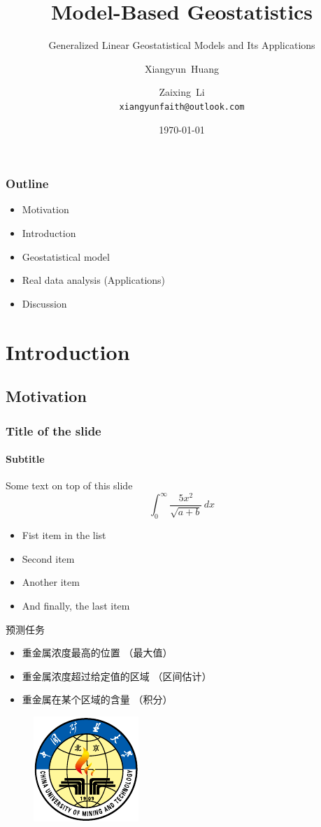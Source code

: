 \documentclass[11pt,UTF8]{ctexbeamer}
\title{Model-Based Geostatistics}
\subtitle{Generalized Linear Geostatistical Models and Its Applications}
\author{Xiangyun~Huang \and Zaixing~Li \\
\texttt{xiangyunfaith@outlook.com} }
\institute[China University of Mining and Technology,Beijing]
{
Department of Statistics\\ %
China University of Mining and Technology,Beijing
}
\date{\today}
\begin{document}
\begin{frame}
\titlepage
\end{frame}

\begin{frame}
\frametitle{Outline}
\begin{itemize}
  \item Motivation
  \item Introduction 
  \item Geostatistical model
  \item Real data analysis (Applications)
  \item Discussion
\end{itemize}
\end{frame}

\section{Introduction}
\subsection{Motivation}
  \begin{frame}
    \frametitle{Title of the slide}
    \framesubtitle{Subtitle}
    Some text on top of this slide
    \[
    \int_{0}^{\infty} \frac{5x^2}{\sqrt{a+b}}\, dx
    \]
    \begin{itemize}
    \item[\checkmark] Fist item in the list
    \item Second item
    \item Another item
    \item And finally, the last item
  \end{itemize}
  \end{frame}
 
\begin{frame}{预测任务}
\begin{itemize}
\item 重金属浓度最高的位置 （最大值）
\item 重金属浓度超过给定值的区域  （区间估计）
\item 重金属在某个区域的含量 （积分）
\end{itemize}
\end{frame}

\begin{frame}
\begin{figure}
\centering
\includegraphics[width=.7\textwidth]{cumtb}
\end{figure}
\end{frame} 
 
 
\end{document}
